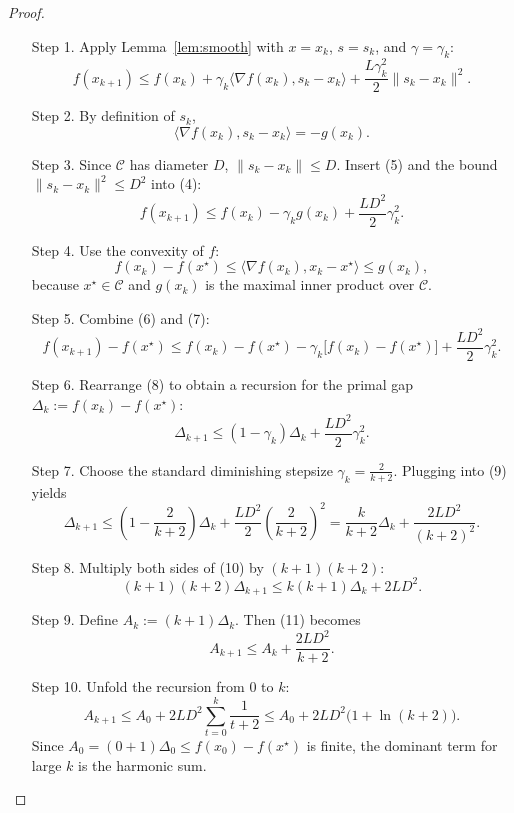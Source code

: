 \documentclass{article}
\begin{document}
\begin{proof}
\begin{enumerate}
\item[Step 1.] Apply Lemma~\ref{lem:smooth} with $x=x_k$, $s=s_k$, and $\gamma=\gamma_k$:
\[
f(x_{k+1})\le f(x_k)+\gamma_k\langle\nabla f(x_k),s_k-x_k\rangle
                +\frac{L\gamma_k^{2}}{2}\|s_k-x_k\|^{2}. \tag{4}
\]

\item[Step 2.] By definition of $s_k$,
\[
\langle\nabla f(x_k),s_k-x_k\rangle = - g(x_k). \tag{5}
\]

\item[Step 3.] Since $\mathcal{C}$ has diameter $D$, $\|s_k-x_k\|\le D$. Insert (5) and the bound $\|s_k-x_k\|^{2}\le D^{2}$ into (4):
\[
f(x_{k+1})\le f(x_k)-\gamma_k g(x_k)+\frac{L D^{2}}{2}\gamma_k^{2}. \tag{6}
\]

\item[Step 4.] Use the convexity of $f$:
\[
f(x_k)-f(x^\star)\le \langle\nabla f(x_k),x_k-x^\star\rangle
                 \le g(x_k), \tag{7}
\]
because $x^\star\in\mathcal{C}$ and $g(x_k)$ is the maximal inner product over $\mathcal{C}$.

\item[Step 5.] Combine (6) and (7):
\[
f(x_{k+1})-f(x^\star)
   \le f(x_k)-f(x^\star)-\gamma_k\bigl[f(x_k)-f(x^\star)\bigr]
        +\frac{L D^{2}}{2}\gamma_k^{2}. \tag{8}
\]

\item[Step 6.] Rearrange (8) to obtain a recursion for the primal gap $\Delta_k:=f(x_k)-f(x^\star)$:
\[
\Delta_{k+1}\le (1-\gamma_k)\Delta_k+\frac{L D^{2}}{2}\gamma_k^{2}. \tag{9}
\]

\item[Step 7.] Choose the standard diminishing stepsize $\displaystyle\gamma_k=\frac{2}{k+2}$.
Plugging into (9) yields
\[
\Delta_{k+1}\le\left(1-\frac{2}{k+2}\right)\Delta_k
               +\frac{L D^{2}}{2}\left(\frac{2}{k+2}\right)^{2}
            =\frac{k}{k+2}\Delta_k+\frac{2 L D^{2}}{(k+2)^{2}}. \tag{10}
\]

\item[Step 8.] Multiply both sides of (10) by $(k+1)(k+2)$:
\[
(k+1)(k+2)\Delta_{k+1}
   \le k(k+1)\Delta_k+2 L D^{2}. \tag{11}
\]

\item[Step 9.] Define $A_k:=(k+1)\Delta_k$.  Then (11) becomes
\[
A_{k+1}\le A_k+\frac{2 L D^{2}}{k+2}. \tag{12}
\]

\item[Step 10.] Unfold the recursion from $0$ to $k$:
\[
A_{k+1}\le A_0+2 L D^{2}\sum_{t=0}^{k}\frac{1}{t+2}
        \le A_0+2 L D^{2}\bigl(1+\ln(k+2)\bigr). \tag{13}
\]
Since $A_0=(0+1)\Delta_0\le f(x_0)-f(x^\star)$ is finite, the dominant term for large $k$ is the harmonic sum.


\end{enumerate}
\end{proof}
\end{document}
